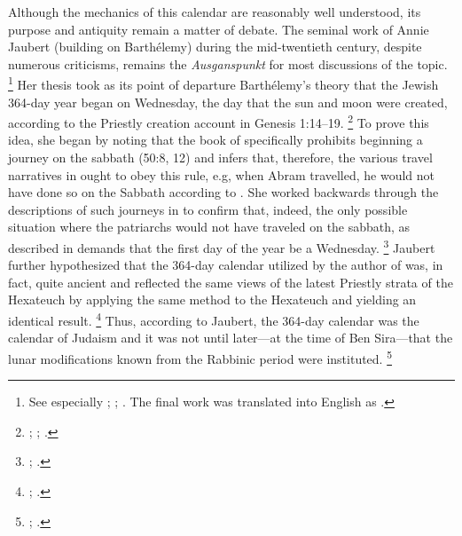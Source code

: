 Although the mechanics of this calendar are reasonably well understood, its purpose and antiquity remain a matter of debate. The seminal work of Annie Jaubert (building on Barthélemy) during the mid-twentieth century, despite numerous criticisms, remains the \emph{Ausganspunkt} for most discussions of the topic.%
    \footnote{See especially
        \cite{jaubert_vt1953};
        \cite{jaubert_vt1957};
        \cite{jaubert1957}.
        The final work was translated into English as
        \cite*{jaubert1965}.}
Her thesis took as its point of departure Barthélemy's theory that the Jewish 364-day year began on Wednesday, the day that the sun and moon were created, according to the Priestly creation account in Genesis 1:14--19.%
    \footnote{%
        \cite{barthelemy_rb1952};
        \cite[250]{jaubert_vt1953};
        \cite[24--25]{jaubert1965}.}
To prove this idea, she began by noting that the book of \jub specifically prohibits beginning a journey on the sabbath (50:8, 12) and infers that, therefore, the various travel narratives in \jub ought to obey this rule, e.g, when Abram travelled, he would not have done so on the Sabbath according to \jub. She worked backwards through the descriptions of such journeys in \jub to confirm that, indeed, the only possible situation where the patriarchs would not have traveled on the sabbath, as described in \jub demands that the first day of the year be a Wednesday.%
    \footnote{%
        \cite[252--254]{jaubert_vt1953};
        \cite[25--27]{jaubert1965}.}
Jaubert further hypothesized that the 364-day calendar utilized by the author of \jub was, in fact, quite ancient and reflected the same views of the latest Priestly strata of the Hexateuch by applying the same method to the Hexateuch and yielding an identical result.%
    \footnote{%
        \cite[258]{jaubert_vt1953};
        \cite[33]{jaubert1965}.}
Thus, according to Jaubert, the 364-day calendar was the calendar of \secondtemple Judaism and it was not until later---at the time of Ben Sira---that the lunar modifications known from the Rabbinic period were instituted.%
    \footnote{%
        \cite[254--258; 262--264]{jaubert_vt1953};
        \cite[47--51]{jaubert1965}.}

